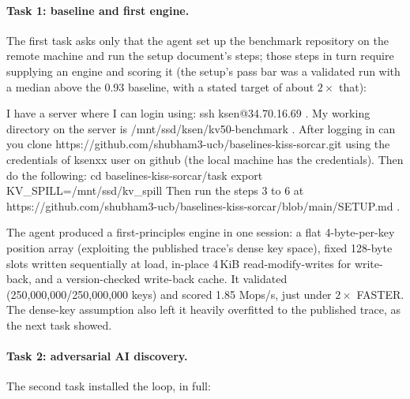 \documentclass{article}
\newenvironment{promptbox}{\begin{mdframed}[linewidth=0.4pt,linecolor=black,innerleftmargin=5pt,innerrightmargin=5pt,innertopmargin=5pt,innerbottommargin=5pt,skipabove=2pt,skipbelow=5pt]\setlength{\parskip}{0pt}\setlength{\parindent}{0pt}\ttfamily\scriptsize\raggedright\frenchspacing\obeylines\leavevmode\strut\ignorespaces}{\end{mdframed}}
\newcommand{\FASTERBase}{0.93}          %
\newcommand{\HydraFirst}{1.85}          %
\newcommand{\NKeys}{250{,}000{,}000}
\begin{document}
\paragraph{Task 1: baseline and first engine.}
The first task asks only that the agent set up the benchmark repository on the remote machine and run the setup document's steps; those steps in turn require supplying an engine and scoring it (the setup's pass bar was a validated run with a median above the \FASTERBase{} baseline, with a stated target of about $2\times$ that):

\begin{promptbox}
I have a server where I can login using: ssh ksen@34.70.16.69 .
My working directory on the server is /mnt/ssd/ksen/kv50-benchmark .
After logging in can you clone https://github.com/shubham3-ucb/baselines-kiss-sorcar.git using the credentials of ksenxx user on github (the local machine has the credentials).  Then do the following:
\textasciigrave\textasciigrave\textasciigrave
cd baselines-kiss-sorcar/task
export KV\_SPILL=/mnt/ssd/kv\_spill
\textasciigrave\textasciigrave\textasciigrave
Then run the steps 3 to 6 at https://github.com/shubham3-ucb/baselines-kiss-sorcar/blob/main/SETUP.md .
\end{promptbox}

The agent produced a first-principles engine in one session: a flat 4-byte-per-key position array (exploiting the published trace's dense key space), fixed 128-byte slots written sequentially at load, in-place 4\,KiB read-modify-writes for write-back, and a version-checked write-back cache. It validated (\NKeys/\NKeys{} keys) and scored \HydraFirst{} Mops/s, just under $2\times$ FASTER. The dense-key assumption also left it heavily overfitted to the published trace, as the next task showed.

\paragraph{Task 2: adversarial AI discovery.}
The second task installed the loop, in full:
\end{document}
